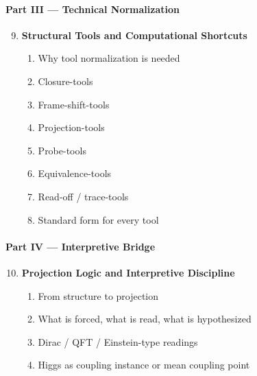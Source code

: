 \documentclass[12pt,a4paper]{article}
\begin{document}
\paragraph{Part III --- Technical Normalization}
\begin{enumerate}[leftmargin=2em,label=\arabic*.]
 \setcounter{enumi}{8}
 \item \textbf{Structural Tools and Computational Shortcuts}
 \begin{enumerate}[label*=\arabic*., leftmargin=2.5em]
 \item Why tool normalization is needed
 \item Closure-tools
 \item Frame-shift-tools
 \item Projection-tools
 \item Probe-tools
 \item Equivalence-tools
 \item Read-off / trace-tools
 \item Standard form for every tool
 \end{enumerate}
\end{enumerate}

\paragraph{Part IV --- Interpretive Bridge}
\begin{enumerate}[leftmargin=2em,label=\arabic*.]
 \setcounter{enumi}{9}
 \item \textbf{Projection Logic and Interpretive Discipline}
 \begin{enumerate}[label*=\arabic*., leftmargin=2.5em]
 \item From structure to projection
 \item What is forced, what is read, what is hypothesized
 \item Dirac / QFT / Einstein-type readings
 \item Higgs as coupling instance or mean coupling point
 \end{enumerate}
\end{enumerate}
\end{document}
